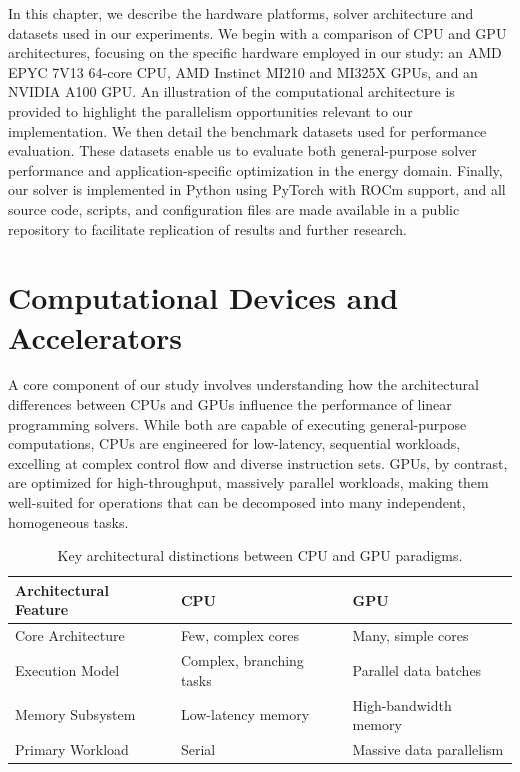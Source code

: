 \documentclass[twoside,12pt,openright]{report}  %
\begin{document}
In this chapter, we describe the hardware platforms, solver architecture and datasets used in our experiments. We begin with a comparison of CPU and GPU architectures, focusing on the specific hardware employed in our study: an AMD EPYC 7V13 64-core CPU, AMD Instinct MI210 and MI325X GPUs, and an NVIDIA A100 GPU. An illustration of the computational architecture is provided to highlight the parallelism opportunities relevant to our implementation.  We then detail the benchmark datasets used for performance evaluation. These datasets enable us to evaluate both general-purpose solver performance and application-specific optimization in the energy domain. Finally, our solver is implemented in Python using PyTorch with ROCm support, and all source code, scripts, and configuration files are made available in a 
public repository \cite{github} to facilitate replication of results and further research.

\section{Computational Devices and Accelerators}
A core component of our study involves understanding how the architectural differences between CPUs and GPUs influence the performance of linear programming solvers. While both are capable of executing general-purpose computations, CPUs are engineered for low-latency, sequential workloads, excelling at complex control flow and diverse instruction sets. GPUs, by contrast, are optimized for high-throughput, massively parallel workloads, making them well-suited for operations that can be decomposed into many independent, homogeneous tasks.
\begin{table}[h!]
\centering
\begin{tabular}{lll}
\hline
\textbf{Architectural Feature} & \textbf{CPU} & \textbf{GPU} \\
\hline
Core Architecture    & Few, complex cores                & Many, simple cores \\
Execution Model      & Complex, branching tasks          & Parallel data batches \\
Memory Subsystem     & Low-latency memory                & High-bandwidth memory \\
Primary Workload     & Serial        & Massive data parallelism \\
\hline
\end{tabular}
\caption{Key architectural distinctions between CPU and GPU paradigms.}
\label{tab:gpu_cpu_summary}
\end{table}
\end{document}
